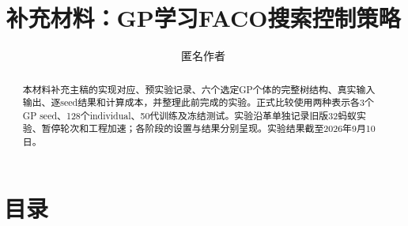 \documentclass[runningheads,orivec]{llncs}
\begin{document}
\title{补充材料：GP学习FACO搜索控制策略}
\author{匿名作者}\institute{}\maketitle
\begin{abstract}
本材料补充主稿的实现对应、预实验记录、六个选定GP个体的完整树结构、真实输入输出、逐seed结果和计算成本，并整理此前完成的实验。正式比较使用两种表示各3个GP seed、128个individual、50代训练及冻结测试。实验沿革单独记录旧版32蚂蚁实验、暂停轮次和工程加速；各阶段的设置与结果分别呈现。实验结果截至2026年9月10日。
\end{abstract}
\setcounter{tocdepth}{1}
\section*{目录}
\makeatletter
\begingroup
\let\l@title\@gobbletwo
\let\l@author\@gobbletwo
\let\authcount\@gobble
{}
\endgroup
\makeatother
\clearpage
\end{document}
